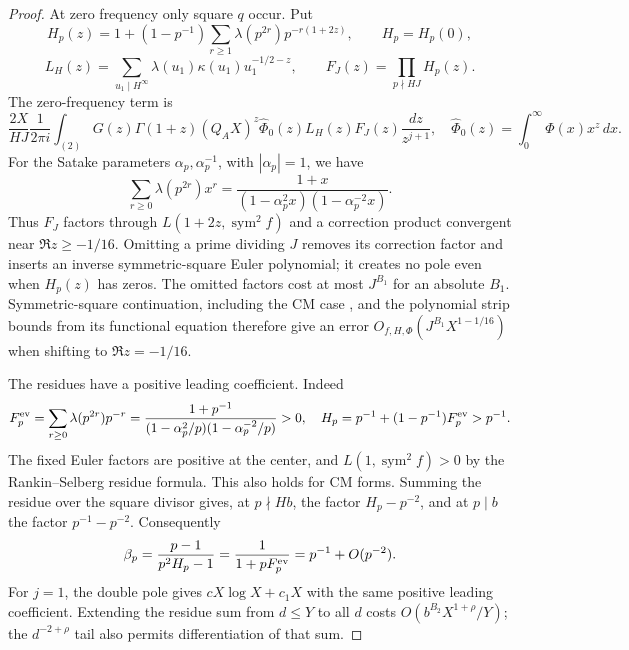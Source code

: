 \begin{proof}
At zero frequency only square $q$ occur. Put
\[
 H_p(z)=1+(1-p^{-1})
     \sum_{r\ge1}\lambda(p^{2r})p^{-r(1+2z)},\qquad H_p=H_p(0),
\]
\[
 L_H(z)=\sum_{u_1\mid H^\infty}
             \lambda(u_1)\kappa(u_1)u_1^{-1/2-z},
 \qquad F_J(z)=\prod_{p\nmid HJ}H_p(z).
\]
The zero-frequency term is
\[
\frac{2X}{HJ}\frac1{2\pi i}\int_{(2)}
G(z)\Gamma(1+z)(Q_AX)^z\widehat\Phi_0(z)L_H(z)F_J(z)
\frac{dz}{z^{j+1}},
\quad
\widehat\Phi_0(z)=\int_0^\infty\Phi(x)x^z\,dx .
\]
For the Satake parameters $\alpha_p,\alpha_p^{-1}$, with
$|\alpha_p|=1$, we have
\[
 \sum_{r\ge0}\lambda(p^{2r})x^r
   =\frac{1+x}{(1-\alpha_p^2x)(1-\alpha_p^{-2}x)}.
\]
Thus $F_J$ factors through $L(1+2z,\operatorname{sym}^2f)$ and a
correction product convergent near $\Re z\ge-1/16$. Omitting a prime
dividing $J$ removes its correction factor and inserts an inverse
symmetric-square Euler polynomial; it creates no pole even when
$H_p(z)$ has zeros. The omitted factors cost at most $J^{B_1}$ for an
absolute $B_1$. Symmetric-square continuation, including the CM case
\cite[Theorem~9.3 and Remark~9.9]{GelbartJacquet1978}, and the
polynomial strip bounds from its functional equation therefore give an error
$O_{f,H,\Phi}(J^{B_1}X^{1-1/16})$ when shifting to $\Re z=-1/16$.

The residues have a positive leading coefficient. Indeed
\[
 F_p^{\rm ev}=\sum_{r\ge0}\lambda(p^{2r})p^{-r}
 =\frac{1+p^{-1}}{(1-\alpha_p^2/p)(1-\alpha_p^{-2}/p)}>0,\quad
 H_p=p^{-1}+(1-p^{-1})F_p^{\rm ev}>p^{-1}.
\]
The fixed Euler factors are positive at the center, and
$L(1,\operatorname{sym}^2f)>0$ by the Rankin--Selberg residue formula.
This also holds for CM forms. Summing the residue over the square
divisor gives, at $p\nmid Hb$, the factor $H_p-p^{-2}$, and at
$p\mid b$ the factor $p^{-1}-p^{-2}$. Consequently
\[
 \beta_p=\frac{p-1}{p^2H_p-1}
        =\frac1{1+pF_p^{\rm ev}}
        =p^{-1}+O(p^{-2}).
\]
For $j=1$, the double pole gives $cX\log X+c_1X$ with the same
positive leading coefficient. Extending the residue sum from $d\le Y$
to all $d$ costs $O(b^{B_2}X^{1+\rho}/Y)$; the $d^{-2+\rho}$ tail
also permits differentiation of that sum.


\end{proof}
